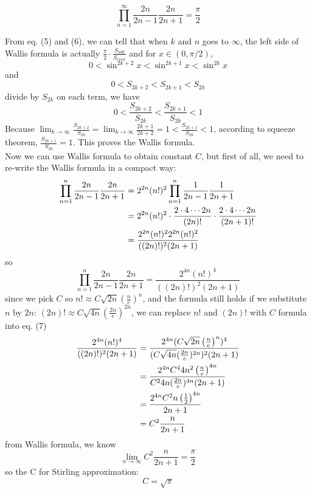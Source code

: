 \documentclass[11pt]{article}
\begin{document}
\begin{tcolorbox} 
[colback=blue!5!white,  colframe=blue!75!black,  title= {\textbf{
Wallis Formula
} }]

$$ \prod _{n=1} ^{\infty } \frac{2n}{2n-1} \frac {2n}{2n+1} = \frac{\pi}{2} $$

\end{tcolorbox}

From eq. (5) and (6),  we can tell that when $k$ and $n$ goes to $\infty$,  the left side of Wallis formula is actually $\displaystyle \frac{\pi}{2} \cdot \frac {S_{odd}}{S_{even}}$ and for $x \in (0,  \pi/2)$,  
$$ 0 < \sin ^{2k+2} x < \sin ^{2k+1} x < \sin ^{2k} x $$
and $$ 0 < S_{2k+2} < S_{2k+1} < S_{2k} $$
divide by $S_{2k}$ on each term,  we have 
$$ 0 < \frac{S_{2k+2}}{S_{2k}} < \frac{ S_{2k+1} } {S_ {2k}} < 1 $$
Because $\displaystyle \lim _{k \to \infty} \frac{S_{2k+2}}{S_{2k}} = \lim _{k \to \infty} \frac{2k+1}{2k+2} = 1  < \frac{S_{2k+1}}{S_{2k}} < 1 $,  according to squeeze theorem,  $ \displaystyle  \frac{S_{2k+1}}{S_{2k}} =  1 $.  This proves the Wallis formula.  \\

Now we can use Wallis formula to obtain constant $C$,  but first of all,  we need to re-write the Wallis formula in a compact way:
$$
\begin{aligned}[t]
 \prod _{n=1} ^{n } \frac{2n}{2n-1} \frac {2n}{2n+1}
    &= 2^{2n} (n!)^2  \prod _{n=1} ^{n } \frac{1}{2n-1} \frac{1}{2n+1}\\
    &= 2^{2n} (n!)^2 \cdot \frac{2 \cdot 4 \cdots 2n}{(2n)!} \cdot \frac{2 \cdot 4 \cdots 2n}{(2n+1)!}\\
    &= \frac{2^{2n} (n!)^2 2^{2n} (n!)^2} {((2n)!)^2 (2n+1)}\\
\end{aligned}\\
$$
so
\begin{equation}
 \prod _{n=1} ^{n } \frac{2n}{2n-1} \frac {2n}{2n+1} = \frac{2^{4n} (n!)^4} {((2n)!)^2 (2n+1)}
\end{equation}
since we pick $C$ so $\displaystyle n! \approx C  \sqrt{2n}  \left( \frac{n}{e} \right) ^n $,  and the formula still holds if we substitute $n$ by $2n$:  $\displaystyle (2n)! \approx C  \sqrt{4n}  \left( \frac{2n}{e} \right) ^{2n} $,  we can replace $n!$ and $(2n)!$ with $C$ formula into eq. (7)
$$
\begin{aligned}[t]
\frac{2^{4n} (n!)^4} {((2n)!)^2 (2n+1)}
	&= \frac{2^{4n} (C  \sqrt{2n}  \left( \frac{n}{e} \right) ^n ) ^4 } { (C \sqrt{4n} ( \frac{2n}{e} ) ^{2n} ) ^2 (2n+1)} \\
	&= \frac{2^{4n} C^4  4n^2  \left( \frac{n}{e} \right) ^{4n} } { C^2 4n ( \frac{2n}{e} ) ^{4n} (2n+1)} \\
	&= \frac{2^{4n} C^2  n  \left( \frac{1}{2} \right) ^{4n} } { 2n+1} \\
	&= C^2 \frac{n} {2n+1} \\
\end{aligned}\\
$$
from Wallis formula,  we know
$$ \lim _{n \to \infty}  C^2 \frac{n} {2n+1} = \frac{\pi}{2} $$
so the C for Stirling approximation: $$C = \sqrt{\pi}$$
\end{document}
